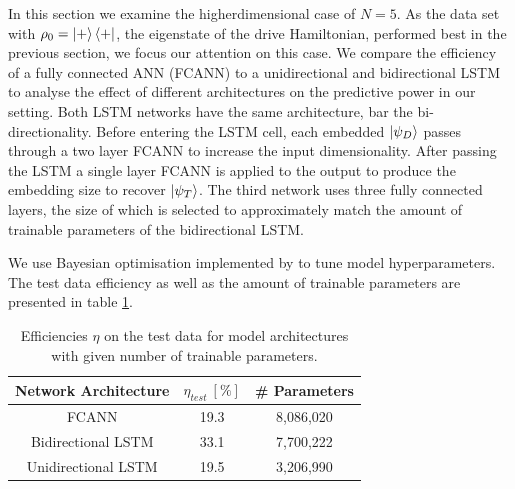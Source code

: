 In this section we examine the higherdimensional case of $N=5$.
As the data set with $\rho_0 = \ket{+} \bra{+}$, the eigenstate of the drive Hamiltonian, performed best in the previous section, we focus our attention on this case.
We compare the efficiency of a fully connected ANN (FCANN) to a unidirectional and bidirectional LSTM to analyse the effect of different architectures on the predictive power in our setting.
Both LSTM networks have the same architecture, bar the bi-directionality.
Before entering the LSTM cell, each embedded $\ket{\psi_D}$ passes through a two layer FCANN to increase the input dimensionality. 
After passing the LSTM a single layer FCANN is applied to the output to produce the embedding size to recover $\ket{\psi_T}$.
The third network uses three fully connected layers, the size of which is selected to approximately match the amount of trainable parameters of the bidirectional LSTM.

We use Bayesian optimisation implemented by \cite{wandb} to tune model hyperparameters.
The test data efficiency as well as the amount of trainable parameters are presented in table \ref{n5efftable}.

\begin{table}[h]
	\centering
	\begin{tabular}{ c | c | c}
		Network Architecture & $\eta_{test} \ [\%]$  & \# Parameters \\
		\hline
		FCANN & 19.3 & 8,086,020 \\
		Bidirectional LSTM & 33.1 & 7,700,222 \\
		Unidirectional LSTM & 19.5 & 3,206,990\\
	\end{tabular}
	\caption{Efficiencies $\eta$ on the test data for model architectures with given number of trainable parameters.}
	\label{n5efftable}
\end{table}


